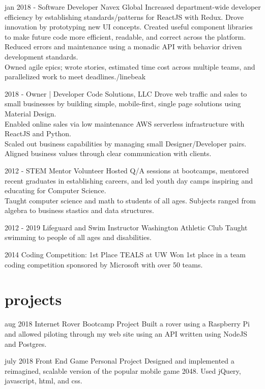 \documentclass[]{friggeri-cv}
\begin{document}
\begin{entrylist}
  \entry 
    {jan 2018 -}
    {Software Developer}
    {Navex Global}
    {Increased department-wide developer efficiency by establishing standards/patterns for ReactJS with Redux. Drove innovation by prototyping new UI concepts. Created useful component libraries to make future code more efficient, readable, and correct across the platform.\\
    Reduced errors and maintenance using a monadic API with behavior driven development standards.\\
    Owned agile epics; wrote stories, estimated time cost across multiple teams, and parallelized work to meet deadlines./linebeak
    }
  
  \entry 
    {2018 - }
    {Owner | Developer}
    {Code Solutions, LLC}
    {Drove web traffic and sales to small businesses by building simple, mobile-first, single page solutions using Material Design. \\
    Enabled online sales via low maintenance AWS serverless infrastructure with ReactJS and Python. \\
    Scaled out business capabilities by managing small Designer/Developer pairs. Aligned business values through clear communication with clients.}

 
  \entry
    {2012 -}
    {STEM Mentor Volunteer}
    {}
    {Hosted Q/A sessions at bootcamps, mentored recent graduates in establishing careers, and led youth day camps inspiring and educating for Computer Science.\\
    Taught computer science and math to students of all ages. Subjects ranged from algebra to business stastics and data structures.}

  \entry
    {2012 - 2019}
    {Lifeguard and Swim Instructor}
    {Washington Athletic Club}
    {Taught swimming to people of all ages and disabilities.}

  \entry
    {2014}
    {Coding Competition: 1st Place}
    {TEALS at UW}
    {Won 1st place in a team coding competition sponsored by Microsoft with over 50 teams.}
  

\end{entrylist}

\section{projects}

\begin{entrylist}

  \entry
    {aug 2018}
    {Internet Rover}
    {Bootcamp Project}
    {Built a rover using a Raspberry Pi and allowed piloting through my web site using an API written using NodeJS and Postgres.}

  \entry
    {july 2018}
    {Front End Game}
    {Personal Project}
    {Designed and implemented a reimagined, scalable version of the popular mobile game 2048. Used jQuery, javascript, html, and css.}

\end{entrylist}
\end{document}
